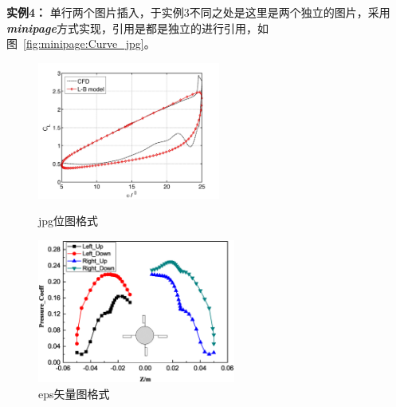 {\bf{实例4：}} 单行两个图片插入，于实例3不同之处是这里是两个独立的图片，采用{\it\bf{minipage}}方式实现，引用是都是独立的进行引用，如图~\ref{fig:minipage:Curve_jpg}。

\begin{figure}[htbp]           
\centering
\begin{minipage}[t]{0.45\linewidth}
    \centering
    \includegraphics[width=6cm]{./img/Curve_jpg}
    \caption{jpg位图格式}
     \label{fig:minipage:Curve_jpg}
\end{minipage}
\hspace{3ex}                                             
\begin{minipage}[t]{0.45\linewidth}
    \centering
    \includegraphics[width=6.5cm]{./img/plot_eps.eps}
    \caption{eps矢量图格式}
    \label{fig:minipage:plot_eps}
\end{minipage}
\end{figure}
